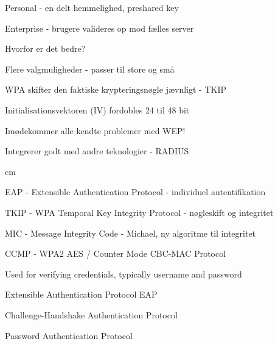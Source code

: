 \documentclass[Screen16to9,17pt]{foils}
\begin{document}
\begin{list1}
\item Personal - en delt hemmelighed, preshared key
\item Enterprise - brugere valideres op mod fælles server
\item Hvorfor er det bedre?
\begin{list2}
\item Flere valgmuligheder - passer til store og små
\item WPA skifter den faktiske krypteringsnøgle jævnligt - TKIP
\item Initialisationsvektoren (IV) fordobles 24 til 48 bit
\item Imødekommer alle kendte problemer med WEP!
\item Integrerer godt med andre teknologier - RADIUS

 cm
\item EAP - Extensible Authentication Protocol - individuel autentifikation
\item TKIP - WPA Temporal Key Integrity Protocol - nøgleskift og integritet
\item MIC - Message Integrity Code - Michael, ny algoritme til integritet
\item CCMP - WPA2 AES / Counter Mode CBC-MAC Protocol
\end{list2}
\end{list1}



\begin{list2}
\item Used for verifying credentials, typically username and password
\item
Extensible Authentication Protocol EAP\\
 \item Challenge-Handshake Authentication Protocol\\
 \item Password Authentication Protocol\\
\end{list2}
\end{document}
